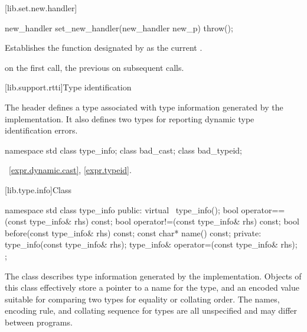[lib.set.new.handler]{}

%
\begin{itemdecl}
new_handler set_new_handler(new_handler new_p) throw();
\end{itemdecl}

\begin{itemdescr}
\pnum
\effects
Establishes the function designated by  as the current
.

\pnum
{} on the first call, the previous  on subsequent calls.
\end{itemdescr}

[lib.support.rtti]{Type identification}

\pnum
The header
defines a
type associated with type information generated by the implementation.
It also defines two types for reporting dynamic type identification errors.

%
%

%
%
%
\begin{codeblock}
namespace std {
  class type_info;
  class bad_cast;
  class bad_typeid;
}
\end{codeblock}

\xref~\ref{expr.dynamic.cast}, \ref{expr.typeid}.

[lib.type.info]{Class }

%
\begin{codeblock}
namespace std {
  class type_info {
  public:
    virtual ~type_info();
    bool operator==(const type_info& rhs) const;
    bool operator!=(const type_info& rhs) const;
    bool before(const type_info& rhs) const;
    const char* name() const;
  private:
    type_info(const type_info& rhs);
    type_info& operator=(const type_info& rhs);
  };
}
\end{codeblock}

\pnum
The class
describes type information generated by the implementation.
Objects of this class effectively store a pointer to a name for the type, and
an encoded value suitable for comparing two types for equality or collating order.
The names, encoding rule, and collating sequence for types are all unspecified
%
and may differ between programs.

